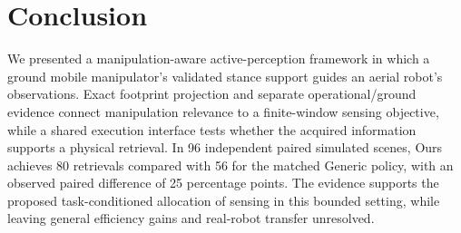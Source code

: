 \section{Conclusion}
We presented a manipulation-aware active-perception framework in which a ground
mobile manipulator's validated stance support guides an aerial robot's
observations. Exact footprint projection and separate operational/ground evidence
connect manipulation relevance to a finite-window sensing objective, while a
shared execution interface tests whether the acquired information supports a
physical retrieval. In 96 independent paired simulated scenes, Ours achieves
80 retrievals compared with 56 for the matched Generic policy, with an
observed paired difference of 25 percentage points. The evidence supports
the proposed task-conditioned allocation of sensing in this bounded setting,
while leaving general efficiency gains and real-robot transfer unresolved.
